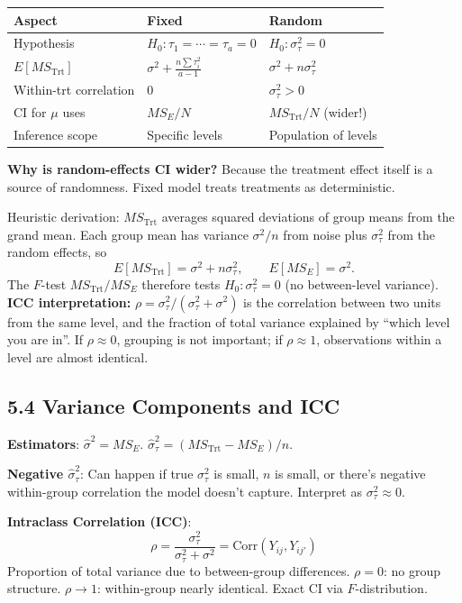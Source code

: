 \documentclass[9pt,letterpaper]{article}
\begin{document}
\begin{center}\small
\begin{tabular}{@{}p{3cm}ll@{}}
\toprule
\textbf{Aspect} & \textbf{Fixed} & \textbf{Random} \\
\midrule
Hypothesis & $H_0:\tau_1=\cdots=\tau_a=0$ & $H_0:\sigma_\tau^2=0$ \\
$E[MS_{\text{Trt}}]$ & $\sigma^2+\frac{n\sum\tau_i^2}{a-1}$ & $\sigma^2+n\sigma_\tau^2$ \\
Within-trt correlation & 0 & $\sigma_\tau^2 > 0$ \\
CI for $\mu$ uses & $MS_E/N$ & $MS_{\text{Trt}}/N$ (wider!) \\
Inference scope & Specific levels & Population of levels \\
\bottomrule
\end{tabular}
\end{center}

\textbf{Why is random-effects CI wider?} Because the treatment effect itself is a source of randomness. Fixed model treats treatments as deterministic.

Heuristic derivation: $MS_{\text{Trt}}$ averages squared deviations of group means from the grand mean. Each group mean has variance $\sigma^2/n$ from noise plus $\sigma_\tau^2$ from the random effects, so
\[
E[MS_{\text{Trt}}] = \sigma^2 + n\sigma_\tau^2,\qquad E[MS_E]=\sigma^2.
\]
The $F$-test $MS_{\text{Trt}}/MS_E$ therefore tests $H_0:\sigma_\tau^2=0$ (no between-level variance).\\[2pt]
\textbf{ICC interpretation:} $\rho = \sigma_\tau^2/(\sigma_\tau^2+\sigma^2)$ is the correlation between two units from the same level, and the fraction of total variance explained by ``which level you are in''. If $\rho\approx0$, grouping is not important; if $\rho\approx1$, observations within a level are almost identical.

\subsection{5.4 Variance Components and ICC}

\textbf{Estimators}: $\hat\sigma^2 = MS_E$. \quad $\hat\sigma_\tau^2 = (MS_{\text{Trt}} - MS_E)/n$.

\textbf{Negative $\hat\sigma_\tau^2$}: Can happen if true $\sigma_\tau^2$ is small, $n$ is small, or there's negative within-group correlation the model doesn't capture. Interpret as $\sigma_\tau^2 \approx 0$.

\textbf{Intraclass Correlation (ICC)}:
\[
\rho = \frac{\sigma_\tau^2}{\sigma_\tau^2 + \sigma^2} = \text{Corr}(Y_{ij}, Y_{ij'})
\]
Proportion of total variance due to between-group differences. $\rho=0$: no group structure. $\rho \to 1$: within-group nearly identical. Exact CI via $F$-distribution.
\end{document}

